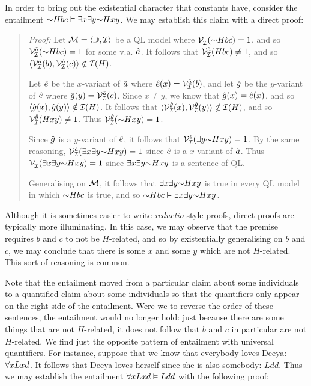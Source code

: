 In order to bring out the existential character that constants have, consider the entailment $\enot Hbc \models \exists x \exists y \enot Hxy$.
We may establish this claim with a direct proof:

\begin{quote}
\label{allmodels4}
  \textit{Proof:}
  Let $\mathcal{M}=\langle\mathbb{D},\mathcal{I}\rangle$ be a QL model where $\VV{\I}{}(\enot Hbc)=1$, and so $\VV{\I}{\va{a}}(\enot Hbc)=1$ for some v.a. $\hat{a}$.
  It follows that $\mathcal{V}_{\mathcal{I}}^{\hat{a}}(Hbc)\neq 1$, and so $\langle\mathcal{V}_{\mathcal{I}}^{\hat{a}}(b),\mathcal{V}_{\mathcal{I}}^{\hat{a}}(c)\rangle\notin \mathcal{I}(H)$.

  Let $\hat{e}$ be the $x$-variant of $\hat{a}$ where $\hat{e}(x)=\mathcal{V}_{\mathcal{I}}^{\hat{a}}(b)$, and let $\hat{g}$ be the $y$-variant of $\hat{e}$ where $\hat{g}(y)=\mathcal{V}_{\mathcal{I}}^{\hat{a}}(c)$.
  Since $x\neq y$, we know that $\hat{g}(x)=\hat{e}(x)$, and so $\langle\hat{g}(x),\hat{g}(y)\rangle\notin \mathcal{I}(H)$.
  It follows that $\langle\mathcal{V}_{\mathcal{I}}^{\hat{g}}(x),\mathcal{V}_{\mathcal{I}}^{\hat{g}}(y)\rangle\notin \mathcal{I}(H)$, and so $\mathcal{V}_{\mathcal{I}}^{\hat{g}}(Hxy)\neq 1$.
  Thus $\VV{\I}{\va{g}}(\enot Hxy)=1$.

  Since $\hat{g}$ is a $y$-variant of $\hat{e}$, it follows that $\VV{\I}{\va{e}}(\qt{\exists}{y}\enot Hxy)=1$.
  By the same reasoning, $\VV{\I}{\va{a}}(\qt{\exists}{x}\qt{\exists}{y}\enot Hxy)=1$ since $\hat{e}$ is a $x$-variant of $\hat{a}$.
  Thus $\VV{\I}{}(\qt{\exists}{x}\qt{\exists}{y}\enot Hxy)=1$ since $\qt{\exists}{x}\qt{\exists}{y}\enot Hxy$ is a sentence of QL. 

  Generalising on $\mathcal{M}$, it follows that $\exists x \exists y \enot Hxy$ is true in every QL model in which $\enot Hbc$ is true, and so $\enot Hbc \models \exists x \exists y \enot Hxy$.
\end{quote}

Although it is sometimes easier to write \textit{reductio} style proofs, direct proofs are typically more illuminating.
In this case, we may observe that the premise requires $b$ and $c$ to not be $H$-related, and so by existentially generalising on $b$ and $c$, we may conclude that there is some $x$ and some $y$ which are not $H$-related. 
This sort of reasoning is common.

Note that the entailment moved from a particular claim about some individuals to a quantified claim about some individuals so that the quantifiers only appear on the right side of the entailment.
Were we to reverse the order of these sentences, the entailment would no longer hold: just because there are some things that are not $H$-related, it does not follow that $b$ and $c$ in particular are not $H$-related. 
We find just the opposite pattern of entailment with universal quantifiers.
For instance, suppose that we know that everybody loves Deeya: $\forall xLxd$.
It follows that Deeya loves herself since she is also somebody: $Ldd$.
Thus we may establish the entailment $\forall xLxd \vDash Ldd$ with the following proof: 

